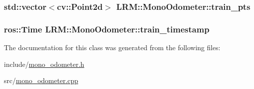 \hypertarget{classLRM_1_1MonoOdometer_accbdc3f32cf2fb8e75f3f40cd8a4e60e}{
\subsubsection[{train\-\_\-pts}]{\setlength{\rightskip}{0pt plus 5cm}std\-::vector$<$cv\-::\-Point2d$>$ {\bf \-L\-R\-M\-::\-Mono\-Odometer\-::train\-\_\-pts}}}\label{classLRM_1_1MonoOdometer_accbdc3f32cf2fb8e75f3f40cd8a4e60e}
\hypertarget{classLRM_1_1MonoOdometer_a7024b12b516c41771d59046471ea7319}{
\subsubsection[{train\-\_\-timestamp}]{\setlength{\rightskip}{0pt plus 5cm}ros\-::\-Time {\bf \-L\-R\-M\-::\-Mono\-Odometer\-::train\-\_\-timestamp}}}\label{classLRM_1_1MonoOdometer_a7024b12b516c41771d59046471ea7319}


\-The documentation for this class was generated from the following files\-:\begin{DoxyCompactItemize}
\item 
include/\hyperlink{mono__odometer_8h}{mono\-\_\-odometer.\-h}\item 
src/\hyperlink{mono__odometer_8cpp}{mono\-\_\-odometer.\-cpp}\end{DoxyCompactItemize}
